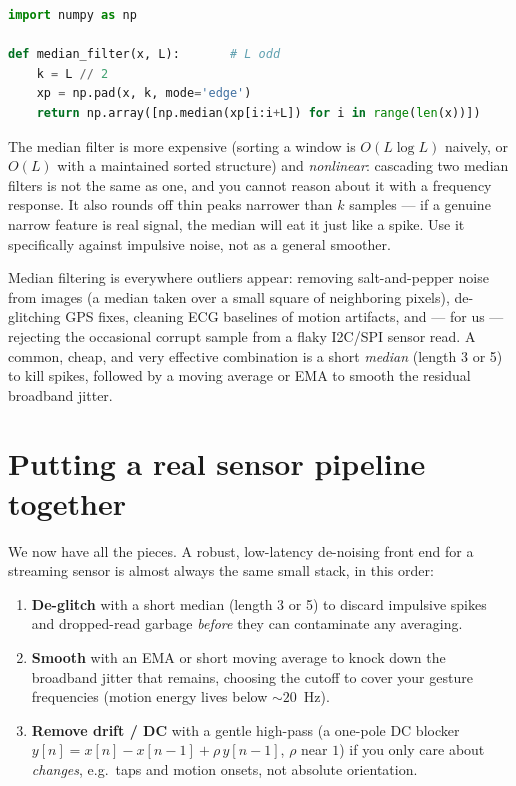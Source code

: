 \begin{lstlisting}[language=Python]
import numpy as np

def median_filter(x, L):       # L odd
    k = L // 2
    xp = np.pad(x, k, mode='edge')
    return np.array([np.median(xp[i:i+L]) for i in range(len(x))])
\end{lstlisting}

\begin{trapbox}
The median filter is more expensive (sorting a window is $O(L\log L)$ naively,
or $O(L)$ with a maintained sorted structure) and \emph{nonlinear}: cascading two
median filters is not the same as one, and you cannot reason about it with a
frequency response. It also rounds off thin peaks narrower than $k$ samples ---
if a genuine narrow feature is real signal, the median will eat it just like a
spike. Use it specifically against impulsive noise, not as a general smoother.
\end{trapbox}

\begin{applicationbox}
Median filtering is everywhere outliers appear: removing salt-and-pepper noise
from images (a median taken over a small square of neighboring pixels), de-glitching GPS fixes, cleaning ECG
baselines of motion artifacts, and --- for us --- rejecting the occasional
corrupt sample from a flaky I2C/SPI sensor read. A common, cheap, and very
effective combination is a short \emph{median} (length 3 or 5) to kill spikes,
followed by a moving average or EMA to smooth the residual broadband jitter.
\end{applicationbox}

\section{Putting a real sensor pipeline together}
\label{ch17:pipeline}

We now have all the pieces. A robust, low-latency de-noising front end for a
streaming sensor is almost always the same small stack, in this order:

\begin{enumerate}
  \item \textbf{De-glitch} with a short median (length 3 or 5) to discard
        impulsive spikes and dropped-read garbage \emph{before} they can
        contaminate any averaging.
  \item \textbf{Smooth} with an EMA or short moving average to knock down the
        broadband jitter that remains, choosing the cutoff to cover your
        gesture frequencies (motion energy lives below $\sim 20$~Hz).
  \item \textbf{Remove drift / DC} with a gentle high-pass (a one-pole DC
        blocker $y[n] = x[n]-x[n-1]+\rho\,y[n-1]$, $\rho$ near $1$) if you only
        care about \emph{changes}, e.g.\ taps and motion onsets, not absolute
        orientation.
\end{enumerate}

